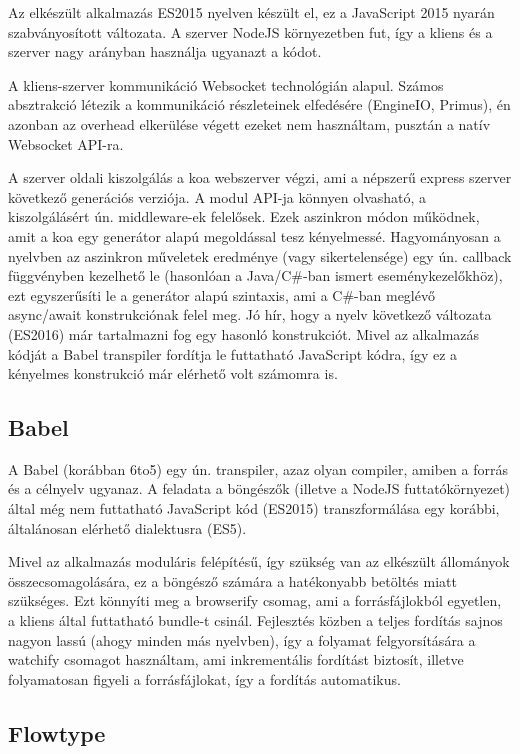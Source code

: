 \documentclass[11pt]{article}
\begin{document}
Az elkészült alkalmazás ES2015 nyelven készült el, ez a JavaScript 2015 nyarán
szabványosított változata. A szerver NodeJS környezetben fut, így a kliens és
a szerver nagy arányban használja ugyanazt a kódot.

A kliens-szerver kommunikáció Websocket technológián alapul.
Számos absztrakció létezik a kommunikáció részleteinek elfedésére (EngineIO, Primus),
én azonban az overhead elkerülése végett ezeket nem használtam, pusztán
a natív Websocket API-ra.

A szerver oldali kiszolgálás a koa webszerver végzi, ami a népszerű express
szerver következő generációs verziója. A modul API-ja könnyen olvasható,
a kiszolgálásért ún. middleware-ek felelősek. Ezek aszinkron módon működnek,
amit a koa egy generátor alapú megoldással tesz kényelmessé.
Hagyományosan a nyelvben az aszinkron műveletek eredménye (vagy sikertelensége)
egy ún. callback függvényben kezelhető le (hasonlóan a Java/C\#-ban ismert eseménykezelőkhöz),
ezt egyszerűsíti le a generátor alapú szintaxis, ami a C\#-ban meglévő async/await
konstrukciónak felel meg. Jó hír, hogy a nyelv következő változata (ES2016) már
tartalmazni fog egy hasonló konstrukciót.
Mivel az alkalmazás kódját a Babel transpiler fordítja le futtatható JavaScript
kódra, így ez a kényelmes konstrukció már elérhető volt számomra is.

\subsection{Babel}

A Babel (korábban 6to5) egy ún. transpiler, azaz olyan compiler, amiben a forrás
és a célnyelv ugyanaz. A feladata a böngészők (illetve a NodeJS futtatókörnyezet)
által még nem futtatható JavaScript kód (ES2015) transzformálása egy korábbi,
általánosan elérhető dialektusra (ES5).

Mivel az alkalmazás moduláris felépítésű, így szükség van az elkészült állományok
összecsomagolására, ez a böngésző számára a hatékonyabb betöltés miatt szükséges.
Ezt könnyíti meg a browserify csomag, ami a forrásfájlokból egyetlen, a kliens
által futtatható bundle-t csinál.
Fejlesztés közben a teljes fordítás sajnos nagyon lassú (ahogy minden más nyelvben),
így a folyamat felgyorsítására a watchify csomagot használtam, ami inkrementális
fordítást biztosít, illetve folyamatosan figyeli a forrásfájlokat,
így a fordítás automatikus.

\subsection{Flowtype}
\end{document}
